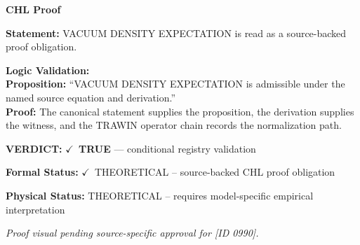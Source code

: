 \vspace{0.45em}
\noindent\textbf{CHL Proof}\par
\textbf{Statement:} VACUUM DENSITY EXPECTATION is read as a source-backed proof obligation.

\textbf{Logic Validation:}\\
\textbf{Proposition:} ``VACUUM DENSITY EXPECTATION is admissible under the named source equation and derivation.''\\
\textbf{Proof:} The canonical statement supplies the proposition, the derivation supplies the witness, and the TRAWIN operator chain records the normalization path.

\textbf{VERDICT:} \ensuremath{\checkmark}\ \textbf{TRUE} --- conditional registry validation

\textbf{Formal Status:} \ensuremath{\checkmark}\ THEORETICAL -- source-backed CHL proof obligation

\textbf{Physical Status:} THEORETICAL -- requires model-specific empirical interpretation
\par\vspace{0.45em}
\par
\vfill
\begingroup\footnotesize\itshape
Proof visual pending source-specific approval for [ID 0990].
\par\endgroup
\vfill
\endgroup
\endgroup
